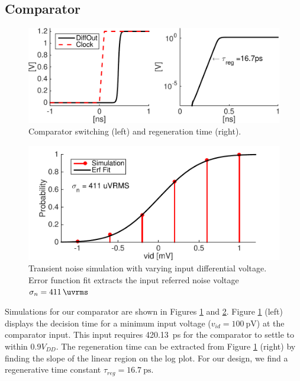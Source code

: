 \documentclass[10pt,journal]{IEEEtran}\usepackage{longtable}
\begin{document}
\subsection{Comparator}
\begin{figure}[tbph]
\begin{center}
\includegraphics[width=1\columnwidth]{Comparator_Result_Reg_Time.pdf}
\caption{Comparator switching (left) and regeneration time (right).}
\label{fig:ComparatorRegTime}
\end{center}
\end{figure}
\begin{figure}[tbph]
\begin{center}
\includegraphics[width=1\columnwidth]{ComparatorTranNoise.pdf}
\caption{Transient noise simulation with varying input differential voltage. Error function fit extracts the input referred noise voltage $\sigma_{n}=\SI{411}{\uvrms}$}
\label{fig:ComparatorTranNoise}
\end{center}
\end{figure}
Simulations for our comparator are shown in Figures \ref{fig:ComparatorRegTime} and \ref{fig:ComparatorTranNoise}. Figure \ref{fig:ComparatorRegTime} (left) displays the decision time for a minimum input voltage ($v_{id}=\SI{100}{\pico\volt}$) at the comparator input. This input requires \SI{420.13}{\pico\second} for the comparator to settle to within $0.9V_{DD}$. The regeneration time can be extracted from Figure \ref{fig:ComparatorRegTime} (right) by finding the slope of the linear region on the log plot. For our design, we find a regenerative time constant $\tau_{reg}=\SI{16.7}{\pico\second}$. 
\end{document}

